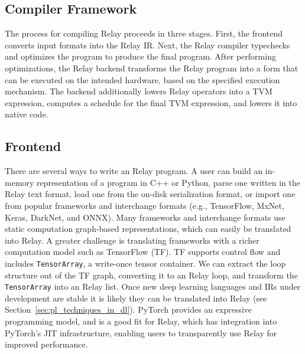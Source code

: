 
\subsection{Compiler Framework}

The process for compiling Relay proceeds in three stages.
First, the frontend converts input formats into the Relay IR.
Next, the Relay compiler typechecks and optimizes the program
  to produce the final program.
After performing optimizations,
  the Relay backend transforms
  the Relay program into a form that can be executed on
  the intended hardware, based on the specified execution mechanism.
The backend additionally lowers Relay operators into a TVM expression,
  computes a schedule for the final TVM expression, and lowers it into
  native code.



  \subsection*{Frontend}

  There are several ways to write an Relay program.
  A user can build an in-memory representation of
    a program in C++ or Python,
    parse one written in the Relay text format,
    load one from the on-disk serialization format,
    or import one from popular frameworks and interchange formats
      (e.g., TensorFlow, MxNet, Keras, DarkNet, and ONNX).
  Many frameworks and interchange formats use static computation graph-based representations,
    which can easily be translated into Relay.
  A greater challenge is translating frameworks
    with a richer computation model such as TensorFlow (TF).
  TF supports control flow and includes \verb|TensorArray|, a write-once
    tensor container.
  We can extract the loop structure out of the TF graph, converting
    it to an Relay loop, and transform the \verb|TensorArray| into an Relay list.
  Once new deep learning languages and IRs under development
    are stable it is likely they can be translated into Relay (see
    Section~\ref{sec:pl_techniques_in_dl}).
  PyTorch provides an expressive programming model, and is a good fit
    for Relay, which has integration into PyTorch's JIT infrastructure,
    enabling users to transparently use Relay for improved performance.

